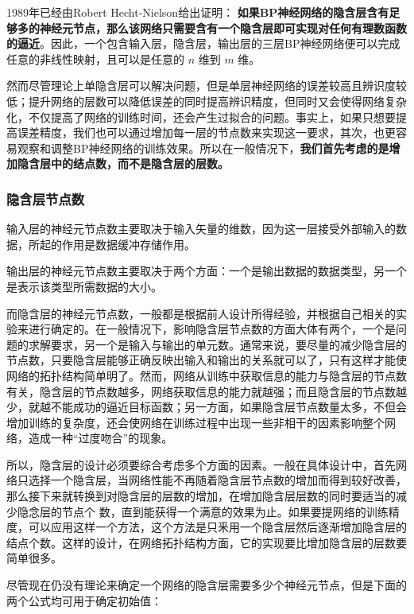 \documentclass[UTF8]{ctexart}
\begin{document}
1989年已经由Robert Hecht-Nielson给出证明： \textbf{如果BP神经网络的隐含层含有足够多的神经元节点，那么该网络只需要含有一个隐含层即可实现对任何有理数函数的逼近}。因此，一个包含输入层，隐含层，输出层的三层BP神经网络便可以完成任意的非线性映射，且可以是任意的 $n$ 维到 $m$ 维。 \par

然而尽管理论上单隐含层可以解决问题，但是单层神经网络的误差较高且辨识度较低；提升网络的层数可以降低误差的同时提高辨识精度，但同时又会使得网络复杂化，不仅提高了网络的训练时间，还会产生过拟合的问题。事实上，如果只想要提高误差精度，我们也可以通过增加每一层的节点数来实现这一要求，其次，也更容易观察和调整BP神经网络的训练效果。所以在一般情况下，\textbf{我们首先考虑的是增加隐含层中的结点数，而不是隐含层的层数。}

\subsubsection{隐含层节点数}

输入层的神经元节点数主要取决于输入矢量的维数，因为这一层接受外部输入的数据，所起的作用是数据缓冲存储作用。 \par
输出层的神经元节点数主要取决于两个方面：一个是输出数据的数据类型，另一个是表示该类型所需数据的大小。 \par

而隐含层的神经元节点数，一般都是根据前人设计所得经验，并根据自己相关的实验来进行确定的。在一般情况下，影响隐含层节点数的方面大体有两个，一个是问题的求解要求，另一个是输入与输出的单元数。通常来说，要尽量的减少隐含层的节点数，只要隐含层能够正确反映出输入和输出的关系就可以了，只有这样才能使网络的拓扑结构简单明了。然而，网络从训练中获取信息的能力与隐含层的节点数有关，隐含层的节点数越多，网络获取信息的能力就越强；而且隐含层的节点数越少，就越不能成功的逼近目标函数；另一方面，如果隐含层节点数量太多，不但会增加训练的复杂度，还会使网络在训练过程中出现一些非相干的因素影响整个网络，造成一种“过度吻合”的现象。 \par

所以，隐含层的设计必须要综合考虑多个方面的因素。一般在具体设计中，首先网络只选择一个隐含层，当网络性能不再随着隐含层节点数的增加而得到较好改善，那么接下来就转换到对隐含层的层数的增加，在增加隐含层层数的同时要适当的减少隐念层的节点个
数，直到能获得一个满意的效果为止。如果要提网络的训练精度，可以应用这样一个方法，这个方法是只釆用一个隐含层然后逐渐增加隐含层的结点个数。这样的设计，在网络拓扑结构方面，它的实现要比增加隐含层的层数要简单很多。

尽管现在仍没有理论来确定一个网络的隐含层需要多少个神经元节点，但是下面的两个公式均可用于确定初始值：
\end{document}
